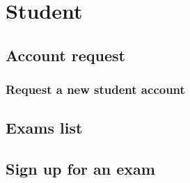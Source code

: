 \documentclass[ManualeUtente]{subfiles}
\begin{document}
\chapter{Student}
\section{Account request}
\subsection{Request a new student account}
\section{Exams list}
\section{Sign up for an exam}
\end{document}
